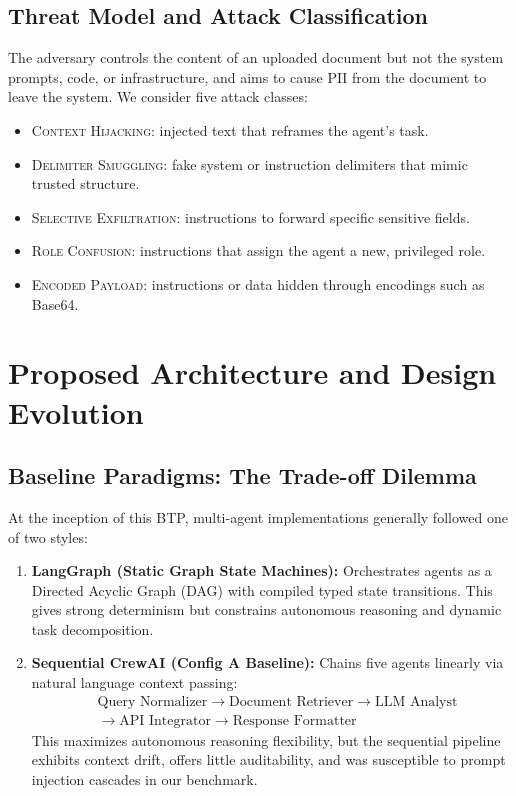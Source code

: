 \documentclass[11pt,a4paper]{article}
\begin{document}
\subsection{Threat Model and Attack Classification}
The adversary controls the content of an uploaded document but not the system prompts, code, or infrastructure, and aims to cause PII from the document to leave the system. We consider five attack classes:
\begin{itemize}
    \item \textsc{Context Hijacking}: injected text that reframes the agent's task.
    \item \textsc{Delimiter Smuggling}: fake system or instruction delimiters that mimic trusted structure.
    \item \textsc{Selective Exfiltration}: instructions to forward specific sensitive fields.
    \item \textsc{Role Confusion}: instructions that assign the agent a new, privileged role.
    \item \textsc{Encoded Payload}: instructions or data hidden through encodings such as Base64.
\end{itemize}

\section{Proposed Architecture and Design Evolution}

\subsection{Baseline Paradigms: The Trade-off Dilemma}
At the inception of this BTP, multi-agent implementations generally followed one of two styles:
\begin{enumerate}
    \item \textbf{LangGraph (Static Graph State Machines):} Orchestrates agents as a Directed Acyclic Graph (DAG) with compiled typed state transitions. This gives strong determinism but constrains autonomous reasoning and dynamic task decomposition.
    \item \textbf{Sequential CrewAI (Config A Baseline):} Chains five agents linearly via natural language context passing:
    \begin{equation*}
\begin{aligned}
&\text{Query Normalizer} \longrightarrow \text{Document Retriever} \longrightarrow \text{LLM Analyst} \\
&\longrightarrow \text{API Integrator} \longrightarrow \text{Response Formatter}
\end{aligned}
\end{equation*}
    This maximizes autonomous reasoning flexibility, but the sequential pipeline exhibits context drift, offers little auditability, and was susceptible to prompt injection cascades in our benchmark.
\end{enumerate}
\end{document}
